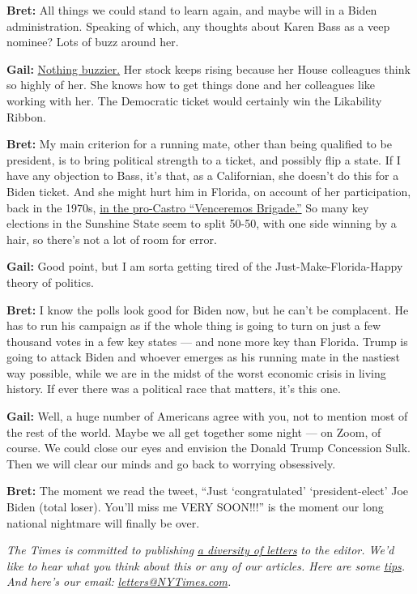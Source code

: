 \textbf{Bret:} All things we could stand to learn again, and maybe will
in a Biden administration. Speaking of which, any thoughts about Karen
Bass as a veep nominee? Lots of buzz around her.

\textbf{Gail:}
\href{https://www.nytimes3xbfgragh.onion/2020/07/31/us/politics/joseph-biden-vice-president.html}{Nothing
buzzier.} Her stock keeps rising because her House colleagues think so
highly of her. She knows how to get things done and her colleagues like
working with her. The Democratic ticket would certainly win the
Likability Ribbon.

\textbf{Bret:} My main criterion for a running mate, other than being
qualified to be president, is to bring political strength to a ticket,
and possibly flip a state. If I have any objection to Bass, it's that,
as a Californian, she doesn't do this for a Biden ticket. And she might
hurt him in Florida, on account of her participation, back in the 1970s,
\href{https://www.theatlantic.com/politics/archive/2020/07/karen-bass-cuba-venceremos-brigade/614662/}{in
the pro-Castro ``Venceremos Brigade.''} So many key elections in the
Sunshine State seem to split 50-50, with one side winning by a hair, so
there's not a lot of room for error.

\textbf{Gail:} Good point, but I am sorta getting tired of the
Just-Make-Florida-Happy theory of politics.

\textbf{Bret:} I know the polls look good for Biden now, but he can't be
complacent. He has to run his campaign as if the whole thing is going to
turn on just a few thousand votes in a few key states --- and none more
key than Florida. Trump is going to attack Biden and whoever emerges as
his running mate in the nastiest way possible, while we are in the midst
of the worst economic crisis in living history. If ever there was a
political race that matters, it's this one.

\textbf{Gail:} Well, a huge number of Americans agree with you, not to
mention most of the rest of the world. Maybe we all get together some
night --- on Zoom, of course. We could close our eyes and envision the
Donald Trump Concession Sulk. Then we will clear our minds and go back
to worrying obsessively.

\textbf{Bret:} The moment we read the tweet, ``Just `congratulated'
`president-elect' Joe Biden (total loser). You'll miss me VERY SOON!!!''
is the moment our long national nightmare will finally be over.

\emph{The Times is committed to publishing}
\href{https://www.nytimes3xbfgragh.onion/2019/01/31/opinion/letters/letters-to-editor-new-york-times-women.html}{\emph{a
diversity of letters}} \emph{to the editor. We'd like to hear what you
think about this or any of our articles. Here are some}
\href{https://help.nytimes3xbfgragh.onion/hc/en-us/articles/115014925288-How-to-submit-a-letter-to-the-editor}{\emph{tips}}\emph{.
And here's our email:}
\href{mailto:letters@NYTimes.com}{\emph{letters@NYTimes.com}}\emph{.}

